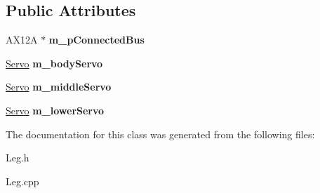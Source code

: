 \subsection*{Public Attributes}
\begin{DoxyCompactItemize}
\item 
\mbox{\label{class_leg_ad524af2808920c519a12fbf39dd3b085}} 
A\+X12A $\ast$ {\bfseries m\+\_\+p\+Connected\+Bus}
\item 
\mbox{\label{class_leg_a2e216786fe3fd6a86abc6dd64b94e355}} 
\mbox{\hyperlink{class_servo}{Servo}} {\bfseries m\+\_\+body\+Servo}
\item 
\mbox{\label{class_leg_a76504a55bf5fa10ca4c017f4d8e40a31}} 
\mbox{\hyperlink{class_servo}{Servo}} {\bfseries m\+\_\+middle\+Servo}
\item 
\mbox{\label{class_leg_a8c384fd114b68f4e9ee1eded87d0bf8b}} 
\mbox{\hyperlink{class_servo}{Servo}} {\bfseries m\+\_\+lower\+Servo}
\end{DoxyCompactItemize}


The documentation for this class was generated from the following files\+:\begin{DoxyCompactItemize}
\item 
Leg.\+h\item 
Leg.\+cpp\end{DoxyCompactItemize}
